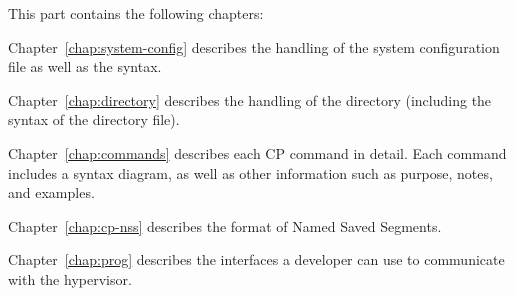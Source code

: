 \cbstart
This part contains the following chapters:

Chapter~\ref{chap:system-config} describes the handling of the system
configuration file as well as the syntax.

Chapter~\ref{chap:directory} describes the handling of the directory
(including the syntax of the directory file).

Chapter~\ref{chap:commands} describes each CP command in detail.  Each
command includes a syntax diagram, as well as other information such as
purpose, notes, and examples.

Chapter~\ref{chap:cp-nss} describes the format of Named Saved Segments.

Chapter~\ref{chap:prog} describes the interfaces a developer can use to
communicate with the hypervisor.
\cbend






